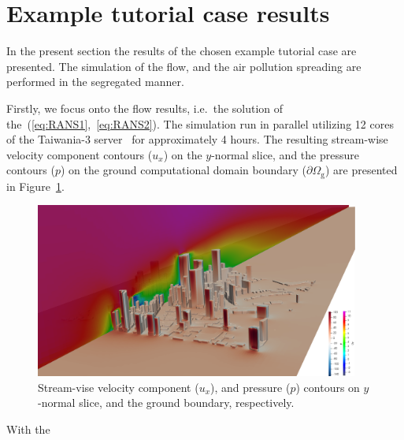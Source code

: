 \cleardoublepage
\section{Example tutorial case results}
\label{sec:exp}

In the present section the results of the chosen example tutorial case are presented. The simulation of the flow, and the air pollution spreading are performed in the segregated manner. 

Firstly, we focus onto the flow results, i.e.\ the solution of the~(\ref{eq:RANS1},~\ref{eq:RANS2}). The simulation run in parallel utilizing 12 cores of the Taiwania-3 server~\cite{tw3} for approximately 4 hours.  The resulting stream-wise velocity component contours ($u_x$) on the $y$-normal slice, and the pressure contours ($p$) on the ground computational domain boundary ($\partial\Omega_{\mathrm{g}}$) are presented in Figure~\ref{fig:ux_p}. 

\begin{figure}[htpb]
    \includegraphics[width=0.95\textwidth]{01_images/res/pUxFront2.png}
    \caption{Stream-vise velocity component ($u_x$), and pressure ($p$) contours on $y$-normal slice, and the ground boundary, respectively.}
    \label{fig:ux_p}
\end{figure}

With the 